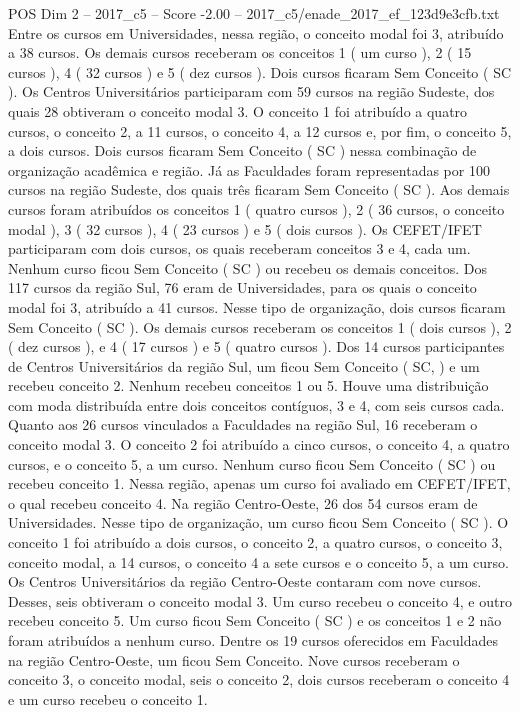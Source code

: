 \begin{textsample}{POS Dim 2 – 2017\_c5 – Score -2.00 – 2017\_c5/enade\_2017\_ef\_123d9e3cfb.txt}
Entre os cursos em Universidades, nessa região, o conceito modal foi 3, atribuído a 38 cursos.
Os demais cursos receberam os conceitos 1 ( um curso ), 2 ( 15 cursos ), 4 ( 32 cursos ) e 5 ( dez cursos ).
Dois cursos ficaram Sem Conceito ( SC ).
Os Centros Universitários participaram com 59 cursos na região Sudeste, dos quais 28 obtiveram o conceito modal 3.
O conceito 1 foi atribuído a quatro cursos, o conceito 2, a 11 cursos, o conceito 4, a 12 cursos e, por fim, o conceito 5, a dois cursos.
Dois cursos ficaram Sem Conceito ( SC ) nessa combinação de organização acadêmica e região.
Já as Faculdades foram representadas por 100 cursos na região Sudeste, dos quais três ficaram Sem Conceito ( SC ).
Aos demais cursos foram atribuídos os conceitos 1 ( quatro cursos ), 2 ( 36 cursos, o conceito modal ), 3 ( 32 cursos ), 4 ( 23 cursos ) e 5 ( dois cursos ).
Os CEFET/IFET participaram com dois cursos, os quais receberam conceitos 3 e 4, cada um.
Nenhum curso ficou Sem Conceito ( SC ) ou recebeu os demais conceitos.
Dos 117 cursos da região Sul, 76 eram de Universidades, para os quais o conceito modal foi 3, atribuído a 41 cursos.
Nesse tipo de organização, dois cursos ficaram Sem Conceito ( SC ).
Os demais cursos receberam os conceitos 1 ( dois cursos ), 2 ( dez cursos ), e 4 ( 17 cursos ) e 5 ( quatro cursos ).
Dos 14 cursos participantes de Centros Universitários da região Sul, um ficou Sem Conceito ( SC, ) e um recebeu conceito 2.
Nenhum recebeu conceitos 1 ou 5.
Houve uma distribuição com moda distribuída entre dois conceitos contíguos, 3 e 4, com seis cursos cada.
Quanto aos 26 cursos vinculados a Faculdades na região Sul, 16 receberam o conceito modal 3.
O conceito 2 foi atribuído a cinco cursos, o conceito 4, a quatro cursos, e o conceito 5, a um curso.
Nenhum curso ficou Sem Conceito ( SC ) ou recebeu conceito 1.
Nessa região, apenas um curso foi avaliado em CEFET/IFET, o qual recebeu conceito 4.
Na região Centro-Oeste, 26 dos 54 cursos eram de Universidades.
Nesse tipo de organização, um curso ficou Sem Conceito ( SC ).
O conceito 1 foi atribuído a dois cursos, o conceito 2, a quatro cursos, o conceito 3, conceito modal, a 14 cursos, o conceito 4 a sete cursos e o conceito 5, a um curso.
Os Centros Universitários da região Centro-Oeste contaram com nove cursos.
Desses, seis obtiveram o conceito modal 3.
Um curso recebeu o conceito 4, e outro recebeu conceito 5.
Um curso ficou Sem Conceito ( SC ) e os conceitos 1 e 2 não foram atribuídos a nenhum curso.
Dentre os 19 cursos oferecidos em Faculdades na região Centro-Oeste, um ficou Sem Conceito.
Nove cursos receberam o conceito 3, o conceito modal, seis o conceito 2, dois cursos receberam o conceito 4 e um curso recebeu o conceito 1.

\end{textsample}

